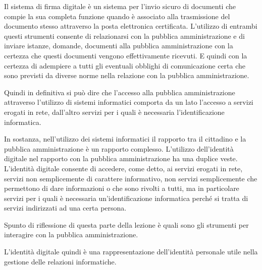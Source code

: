 Il sistema di firma digitale è un sistema per l'invio sicuro di documenti che compie la sua completa funzione quando è associato alla trasmissione del documento stesso attraverso la posta elettronica certificata. L'utilizzo di entrambi questi strumenti consente di relazionarsi con la pubblica amministrazione e di inviare istanze, domande, documenti alla pubblica amministrazione con la certezza che questi documenti vengono effettivamente ricevuti. E quindi con la certezza di adempiere a tutti gli eventuali obblighi di comunicazione certa che sono previsti da diverse norme nella relazione con la pubblica amministrazione. \par
 Quindi in definitiva si può dire che l'accesso alla pubblica amministrazione attraverso l'utilizzo di sistemi informatici comporta da un lato l'accesso a servizi erogati in rete, dall'altro servizi per i quali è necessaria l'identificazione informatica. 
 \par
 In sostanza, nell'utilizzo dei sistemi informatici il rapporto tra il cittadino e la pubblica amministrazione è un rapporto complesso. L'utilizzo dell'identità digitale nel rapporto con la pubblica amministrazione ha una duplice veste. L'identità digitale consente di accedere, come detto, ai servizi erogati in rete, servizi non semplicemente di carattere informativo, non servizi semplicemente che permettono di dare informazioni o che sono rivolti a tutti, ma in particolare servizi per i quali è necessaria un'identificazione informatica perché si tratta di servizi indirizzati ad una certa persona.\par
 Spunto di riflessione di questa parte della lezione è quali sono gli strumenti per interagire con la pubblica amministrazione. \par
 L'identità digitale quindi è una rappresentazione dell'identità personale utile nella gestione delle relazioni informatiche.